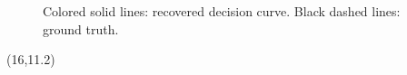 \documentclass[a0]{a0poster}
\begin{document}
\begin{textblock}{7}
\begin{minipage}{0.3\textwidth}
\begin{figure}
        \caption{\small
            Colored solid lines: recovered decision curve.
            Black dashed lines: ground truth.
        }
    \end{figure}
\end{minipage}
\end{textblock}

\begin{textblock}{7}(16,11.2)
    \small
    \nocite{*}
    
\end{textblock}
\end{document}
